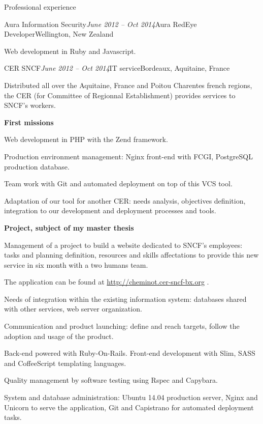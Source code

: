 \begin{rSection}{Professional experience}

  \begin{rSubsection}{Aura Information Security}{\em June 2012 -- Oct 2014}{Aura RedEye Developer}{Wellington, New Zealand}
    \item[] Web development in Ruby and Javascript.
  \end{rSubsection}



  \begin{rSubsection}{CER SNCF}{\em June 2012 -- Oct 2014}{IT service}{Bordeaux, Aquitaine, France}
    \item[] Distributed all over the Aquitaine, France and Poitou Charentes french regions, the CER (for Committee of Regionnal Establishment) provides services to SNCF's workers.

    \textbf{First missions}
      \item Web development in PHP with the Zend framework.
      \item Production environment management: Nginx front-end with FCGI, PostgreSQL production database.
      \item Team work with Git and automated deployment on top of this VCS tool.
      \item Adaptation of our tool for another CER: needs analysis, objectives definition, integration to our development and deployment processes and tools.

    \textbf{Project, subject of my master thesis}
      \item Management of a project to build a website dedicated to SNCF's employees: tasks and planning definition, resources and skills affectations to provide this new service in six month with a two humans team.
      \item The application can be found at \href{http://cheminot.cer-sncf-bx.org}{http://cheminot.cer-sncf-bx.org} .
      \item Needs of integration within the existing information system: databases shared with other services, web server organization.
      \item Communication and product launching: define and reach targets, follow the adoption and usage of the product.
      \item Back-end powered with Ruby-On-Rails. Front-end development with Slim, SASS and CoffeeScript templating languages.
      \item Quality management by software testing using Rspec and Capybara.
      \item System and database administration: Ubuntu 14.04 production server, Nginx and Unicorn to serve the application, Git and Capistrano for automated deployment tasks.


\end{rSubsection}
\end{rSection}
